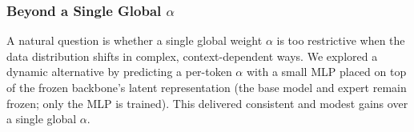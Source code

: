 \documentclass[11pt]{article}
\begin{document}
\begin{table}[!htb]
  \centering
  \caption{Compression rates on datasets \texttt{enwik8}, as $\alpha$ are changed from 1.0 to 0.01 and context length changed from 1 to 2048.}
  \label{tab:muti_experts_compression_results}
\end{table}

\subsubsection{Beyond a Single Global $\alpha$}
\label{subsec:dynamic-alpha}

A natural question is whether a single global weight $\alpha$ is too restrictive when the data distribution shifts in complex, context-dependent ways. We explored a dynamic alternative by predicting a per-token $\alpha$ with a small MLP placed on top of the frozen backbone's latent representation (the base model and expert remain frozen; only the MLP is trained). This delivered consistent and modest gains over a single global $\alpha$.
\end{document}
